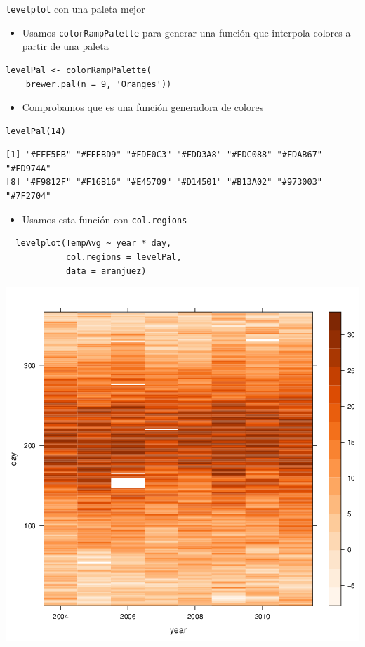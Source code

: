 \documentclass[xcolor={usenames,svgnames,dvipsnames}]{beamer}
\begin{document}
\begin{frame}[fragile,label={sec:orgheadline43}]{\texttt{levelplot} con una paleta mejor}
 \begin{itemize}
\item Usamos \texttt{colorRampPalette} para generar una función que interpola colores a partir de una paleta
\end{itemize}
\lstset{language=R,label= ,caption= ,captionpos=b,numbers=none}
\begin{lstlisting}
levelPal <- colorRampPalette(
    brewer.pal(n = 9, 'Oranges'))
\end{lstlisting}
\begin{itemize}
\item Comprobamos que es una función generadora de colores
\end{itemize}

\lstset{language=R,label= ,caption= ,captionpos=b,numbers=none}
\begin{lstlisting}
levelPal(14)
\end{lstlisting}

\begin{verbatim}
[1] "#FFF5EB" "#FEEBD9" "#FDE0C3" "#FDD3A8" "#FDC088" "#FDAB67" "#FD974A"
[8] "#F9812F" "#F16B16" "#E45709" "#D14501" "#B13A02" "#973003" "#7F2704"
\end{verbatim}

\begin{itemize}
\item Usamos esta función con \texttt{col.regions}
\end{itemize}
\lstset{language=R,label= ,caption= ,captionpos=b,numbers=none}
\begin{lstlisting}
  levelplot(TempAvg ~ year * day,
            col.regions = levelPal,
            data = aranjuez)
\end{lstlisting}
\end{frame}

\begin{frame}[label={sec:orgheadline44}]{}
\includegraphics[width=.9\linewidth]{figs/levelplotPal.png}
\end{frame}
\end{document}
